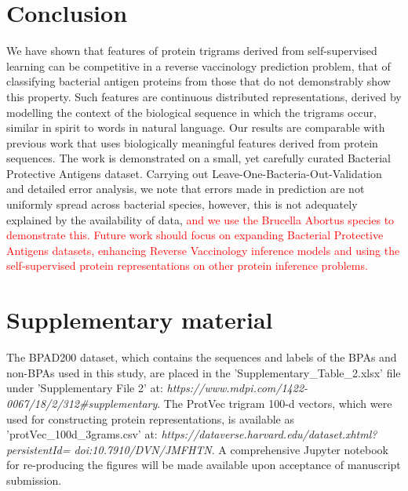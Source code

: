 \documentclass[10pt,journal,compsoc,twoside]{IEEEtran}
\begin{document}
\section{Conclusion}

We have shown that features of protein trigrams derived from self-supervised learning can be competitive in a reverse vaccinology prediction problem, that of classifying bacterial antigen proteins from those that do not demonstrably show this property. Such features are continuous distributed representations, derived by modelling the context of the biological sequence in which the trigrams occur, similar in spirit to words in natural language. Our results are comparable with previous work that uses biologically meaningful features derived from protein sequences. The work is demonstrated on a small, yet carefully curated Bacterial Protective Antigens dataset. Carrying out Leave-One-Bacteria-Out-Validation and detailed error analysis, we note that errors made in prediction are not uniformly spread across bacterial species, however, this is not adequately explained by the availability of data, \textcolor{red}{and we use the Brucella Abortus species to demonstrate this. Future work should focus on expanding Bacterial Protective Antigens datasets, enhancing Reverse Vaccinology inference models and using the self-supervised protein representations on other protein inference problems.} 


\section{Supplementary material}
The BPAD200 dataset, which contains the sequences and labels of the BPAs and non-BPAs used in this study, are placed in the 'Supplementary\_Table\_2.xlsx' file under 'Supplementary File 2' at: \textit{https://www.mdpi.com/1422-
0067/18/2/312\#supplementary}. The ProtVec trigram 100-d vectors, which were used for constructing protein representations, is available as 'protVec\_100d\_3grams.csv' at: 
\textit{https://dataverse.harvard.edu/dataset.xhtml?persistentId=
doi:10.7910/DVN/JMFHTN}. A comprehensive Jupyter notebook for re-producing the figures will be made available upon acceptance of manuscript submission.  

\ifCLASSOPTIONcaptionsoff
  \newpage
\fi
\end{document}
